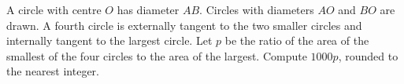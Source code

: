 A circle with centre $O$ has diameter $AB$. Circles with diameters $AO$ and $BO$ are drawn. A fourth circle is externally tangent to the two smaller circles and internally tangent to the largest circle. Let $p$ be the ratio of the area of the smallest of the four circles to the area of the largest. Compute $1000p$, rounded to the nearest integer.
